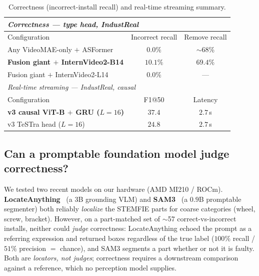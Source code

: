 \documentclass[11pt]{article}
\newcommand{\best}[1]{\textcolor{best}{\textbf{#1}}}
\begin{document}
\begin{table}[H]
\centering
\caption{Correctness (incorrect-install recall) and real-time streaming summary.}
\label{tab:extra}
\small
\begin{tabular}{lcc}
\toprule
\multicolumn{3}{l}{\textit{Correctness --- type head, IndustReal}} \\
\midrule
Configuration & Incorrect recall & Remove recall \\
Any VideoMAE-only $+$ ASFormer & $0.0\%$ & $\sim$68\% \\
\best{Fusion giant $+$ InternVideo2-B14} & \best{$10.1\%$} & $69.4\%$ \\
Fusion giant $+$ InternVideo2-L14 & $0.0\%$ & --- \\
\midrule
\multicolumn{3}{l}{\textit{Real-time streaming --- IndustReal, causal}} \\
\midrule
Configuration & F1@50 & Latency \\
\best{v3 causal ViT-B $+$ GRU ($L{=}16$)} & \best{$37.4$} & $2.7$\,s \\
v3 TeSTra head ($L{=}16$) & $24.8$ & $2.7$\,s \\
\bottomrule
\end{tabular}
\end{table}

\subsection{Can a promptable foundation model judge correctness?}
We tested two recent models on our hardware (AMD MI210 / ROCm). \textbf{LocateAnything}~\cite{locateanything}
(a $3$B grounding VLM) and \textbf{SAM3}~\cite{sam3} (a $0.9$B promptable segmenter) both reliably
\emph{localize} the STEMFIE parts for coarse categories (wheel, screw, bracket). However, on a part-matched set
of $\sim$57 correct-vs-incorrect installs, neither could \emph{judge} correctness: LocateAnything echoed the
prompt as a referring expression and returned boxes regardless of the true label ($100\%$ recall / $51\%$
precision $=$ chance), and SAM3 segments a part whether or not it is faulty. Both are \emph{locators, not judges};
correctness requires a downstream comparison against a reference, which no perception model supplies.
\end{document}
